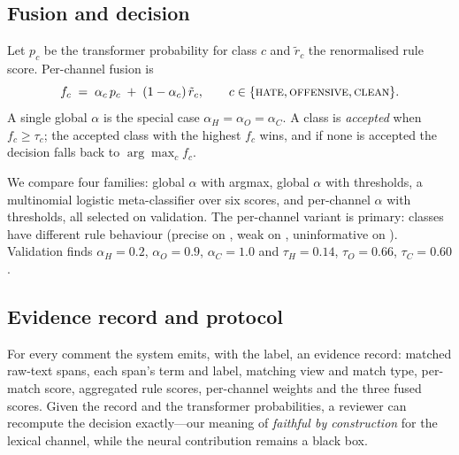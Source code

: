 \subsection{Fusion and decision}
\label{sec:fusion}

Let $p_c$ be the transformer probability for class $c$ and $\tilde r_c$ the
renormalised rule score. Per-channel fusion is
\begin{equation}
f_c \;=\; \alpha_c\,p_c \;+\; (1-\alpha_c)\,\tilde r_c,
\qquad c\in\{\textsc{hate}{},\textsc{offensive}{},\textsc{clean}{}\}.
\label{eq:fusion}
\end{equation}
A single global $\alpha$ is the special case $\alpha_H=\alpha_O=\alpha_C$. A class
is \emph{accepted} when $f_c\ge\tau_c$; the accepted class with the highest $f_c$
wins, and if none is accepted the decision falls back to $\arg\max_c f_c$.

We compare four families: global $\alpha$ with argmax, global $\alpha$ with
thresholds, a multinomial logistic meta-classifier over six scores, and per-channel
$\alpha$ with thresholds, all selected on validation. The per-channel variant is primary:
classes have different rule behaviour (precise on \hate{}, weak on \off{}, uninformative
on \clean{}). Validation finds $\alpha_H=0.2$, $\alpha_O=0.9$, $\alpha_C=1.0$ and
$\tau_H=0.14$, $\tau_O=0.66$, $\tau_C=0.60$.

\subsection{Evidence record and protocol}
\label{sec:evidence}

For every comment the system emits, with the label, an evidence record: matched
raw-text spans, each span's term and label, matching view and match type, per-match
score, aggregated rule scores, per-channel weights and the three fused scores. Given
the record and the transformer probabilities, a reviewer can recompute the decision
exactly---our meaning of \emph{faithful by construction} for the lexical channel, while
the neural contribution remains a black box.
